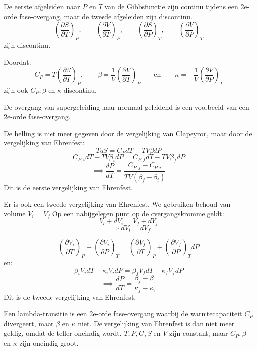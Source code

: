 De eerste afgeleiden naar \(P\) en \(T\) van de Gibbsfunctie zijn continu tijdens een 2e-orde fase-overgang, maar de tweede afgeleiden zijn discontinu.
\[\left(\frac{\partial S}{\partial T}\right)_P ,\qquad \left(\frac{\partial V}{\partial T}\right)_P, \qquad \left(\frac{\partial S}{\partial P}\right)_T, \qquad \left(\frac{\partial V}{\partial P}\right)_T \]
zijn discontinu.

Doordat:
\[C_P = T \left(\frac{\partial S}{\partial T}\right)_P, \qquad \beta = \frac{1}{V} \left(\frac{\partial V}{\partial T}\right)_P \qquad\text{en}\qquad \kappa = -\frac{1}{V} \left(\frac{\partial V}{\partial P}\right)_T \]
zijn ook \(C_P, \beta\) en \(\kappa\) discontinu.

De overgang van supergeleiding naar normaal geleidend is een voorbeeld van een 2e-orde fase-overgang.

De helling is niet meer gegeven door de vergelijking van Clapeyron, maar door de vergelijking van Ehrenfest:
\[TdS = C_P dT - TV\beta dP\]
\[C_{P,i}dT - TV\beta _{i}dP = C_{P,f}dT - TV\beta _{f}dP\]
\[\implies \frac{dP}{dT} = \frac{C_{P,f} - C_{P,i}}{TV(\beta_f - \beta_i)}\]
Dit is de eerste vergelijking van Ehrenfest.

Er is ook een tweede vergelijking van Ehrenfest.
We gebruiken behoud van volume \(V_i = V_f\)
Op een nabijgelegen punt op de overgangskromme geldt:
\[V_i + dV_i = V_f + dV_f\]
\[\implies dV_i = dV_f\]

\[\left(\frac{\partial V_i}{\partial T}\right)_P + \left(\frac{\partial V_{i}}{\partial P}\right)_T 
= 
\left(\frac{\partial V_f}{\partial T}\right)_P + \left(\frac{\partial V_f}{\partial P}\right)_T dP\]
en:
\[\beta_i V_i dT - \kappa_i V_i dP = \beta_f V_f dT - \kappa_f V_f dP\]
\[\implies \frac{dP}{dT} = \frac{\beta_f - \beta_i}{\kappa_f - \kappa_i}\]
Dit is de tweede vergelijking van Ehrenfest.

\begin{definition}
    Een lambda-transitie is een 2e-orde fase-overgang waarbij de warmtecapaciteit \(C_P\) divergeert, maar \(\beta\) en \(\kappa\) niet. De vergelijking van Ehrenfest is dan niet meer geldig, omdat de teller oneindig wordt. 
    \(T, P, G, S \) en \(V\) zijn constant, maar \(C_P, \beta\) en \(\kappa\) zijn oneindig groot.
\end{definition}

